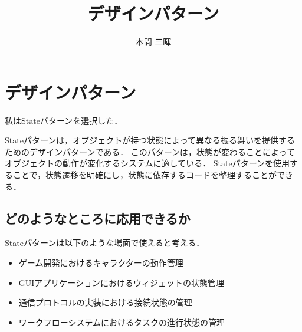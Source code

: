 \documentclass[titlepage,a4paper]{jsarticle}
\title{デザインパターン}
\author{本間 三暉}
\begin{document}
\maketitle
\section{デザインパターン}
私はStateパターンを選択した．

Stateパターンは，オブジェクトが持つ状態によって異なる振る舞いを提供するためのデザインパターンである．
このパターンは，状態が変わることによってオブジェクトの動作が変化するシステムに適している．
Stateパターンを使用することで，状態遷移を明確にし，状態に依存するコードを整理することができる．
\subsection{どのようなところに応用できるか}
Stateパターンは以下のような場面で使えると考える．
\begin{itemize}
  \item ゲーム開発におけるキャラクターの動作管理
  \item GUIアプリケーションにおけるウィジェットの状態管理
  \item 通信プロトコルの実装における接続状態の管理
  \item ワークフローシステムにおけるタスクの進行状態の管理
\end{itemize}
\end{document}
